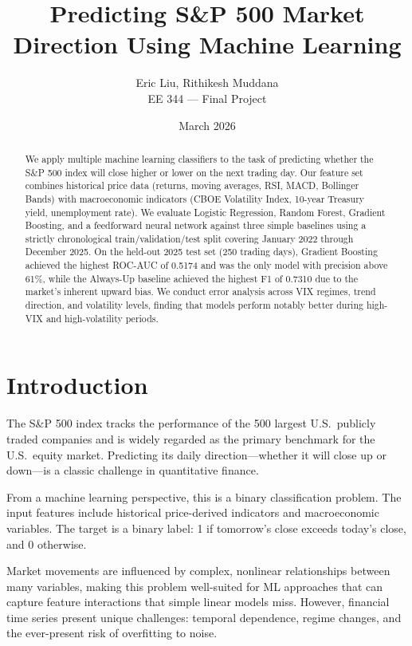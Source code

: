 \documentclass[11pt]{article}
\title{\textbf{Predicting S\&P 500 Market Direction Using Machine Learning}}
\author{Eric Liu, Rithikesh Muddana \\ EE 344 --- Final Project}
\date{March 2026}
\begin{document}
\maketitle

\begin{abstract}
We apply multiple machine learning classifiers to the task of predicting whether the S\&P 500 index will close higher or lower on the next trading day. Our feature set combines historical price data (returns, moving averages, RSI, MACD, Bollinger Bands) with macroeconomic indicators (CBOE Volatility Index, 10-year Treasury yield, unemployment rate). We evaluate Logistic Regression, Random Forest, Gradient Boosting, and a feedforward neural network against three simple baselines using a strictly chronological train/validation/test split covering January 2022 through December 2025. On the held-out 2025 test set (250 trading days), Gradient Boosting achieved the highest ROC-AUC of 0.5174 and was the only model with precision above 61\%, while the Always-Up baseline achieved the highest F1 of 0.7310 due to the market's inherent upward bias. We conduct error analysis across VIX regimes, trend direction, and volatility levels, finding that models perform notably better during high-VIX and high-volatility periods.
\end{abstract}

\section{Introduction}
\label{sec:intro}

The S\&P 500 index tracks the performance of the 500 largest U.S.\ publicly traded companies and is widely regarded as the primary benchmark for the U.S.\ equity market. Predicting its daily direction---whether it will close up or down---is a classic challenge in quantitative finance.

From a machine learning perspective, this is a binary classification problem. The input features include historical price-derived indicators and macroeconomic variables. The target is a binary label: 1 if tomorrow's close exceeds today's close, and 0 otherwise.

Market movements are influenced by complex, nonlinear relationships between many variables, making this problem well-suited for ML approaches that can capture feature interactions that simple linear models miss. However, financial time series present unique challenges: temporal dependence, regime changes, and the ever-present risk of overfitting to noise.
\end{document}
